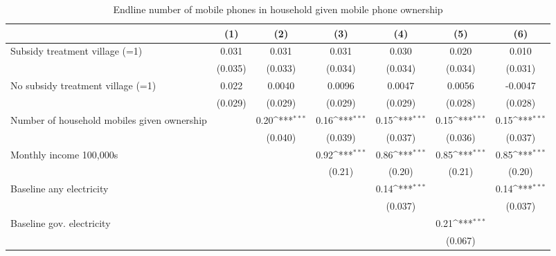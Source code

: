 \begin{table}[htbp]\centering
\def\sym#1{\ifmmode^{#1}\else\(^{#1}\)\fi}
\caption{Endline number of mobile phones in household given mobile phone ownership}
\begin{tabular*}{1\hsize}{@{\hskip\tabcolsep\extracolsep\fill}l*{6}{c}}
\toprule
                &\multicolumn{1}{c}{(1)}         &\multicolumn{1}{c}{(2)}         &\multicolumn{1}{c}{(3)}         &\multicolumn{1}{c}{(4)}         &\multicolumn{1}{c}{(5)}         &\multicolumn{1}{c}{(6)}         \\
\midrule
Subsidy treatment village (=1)&    0.031         &    0.031         &    0.031         &    0.030         &    0.020         &    0.010         \\
                &  (0.035)         &  (0.033)         &  (0.034)         &  (0.034)         &  (0.034)         &  (0.031)         \\
No subsidy treatment village (=1)&    0.022         &   0.0040         &   0.0096         &   0.0047         &   0.0056         &  -0.0047         \\
                &  (0.029)         &  (0.029)         &  (0.029)         &  (0.029)         &  (0.028)         &  (0.028)         \\
Number of household mobiles given ownership&                  &     0.20\sym{***}&     0.16\sym{***}&     0.15\sym{***}&     0.15\sym{***}&     0.15\sym{***}\\
                &                  &  (0.040)         &  (0.039)         &  (0.037)         &  (0.036)         &  (0.037)         \\
Monthly income 100,000s&                  &                  &     0.92\sym{***}&     0.86\sym{***}&     0.85\sym{***}&     0.85\sym{***}\\
                &                  &                  &   (0.21)         &   (0.20)         &   (0.21)         &   (0.20)         \\
Baseline any electricity&                  &                  &                  &     0.14\sym{***}&                  &     0.14\sym{***}\\
                &                  &                  &                  &  (0.037)         &                  &  (0.037)         \\
Baseline gov. electricity&                  &                  &                  &                  &     0.21\sym{***}&                  \\
                &                  &                  &                  &                  &  (0.067)         &                  \\

\end{tabular*}
\end{table}

